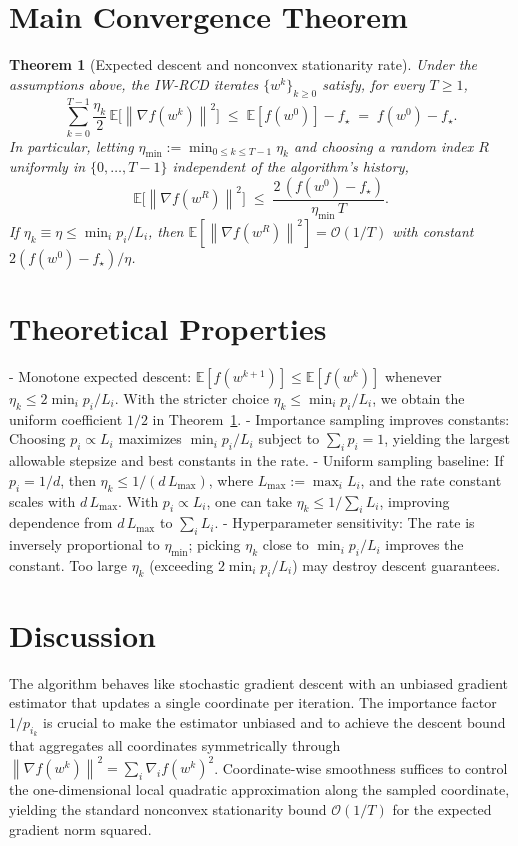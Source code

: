 \documentclass[11pt]{article}
\newtheorem{theorem}{Theorem}
\newcommand{\E}{\mathbb{E}}
\newcommand{\1}{\mathbbm{1}}
\newcommand{\norm}[1]{\left\lVert #1 \right\rVert}
\begin{document}
\section*{Main Convergence Theorem}
\begin{theorem}[Expected descent and nonconvex stationarity rate]
\label{thm:main}
Under the assumptions above, the IW-RCD iterates $\{w^k\}_{k\ge 0}$ satisfy, for every $T\ge 1$,
\[
\sum_{k=0}^{T-1} \frac{\eta_k}{2}\, \E\big[\norm{\nabla f(w^k)}^2\big]
\;\le\; \E[f(w^0)] - f_\star \;=\; f(w^0)-f_\star.
\]
In particular, letting $\eta_{\min}:=\min_{0\le k\le T-1}\eta_k$ and choosing a random index $R$ uniformly in $\{0,\dots,T-1\}$ independent of the algorithm's history,
\[
\E\big[\norm{\nabla f(w^R)}^2\big] \;\le\; \frac{2\,(f(w^0)-f_\star)}{\eta_{\min}\,T}.
\]
If $\eta_k\equiv \eta \le \min_i p_i/L_i$, then $\E[\norm{\nabla f(w^R)}^2]=\mathcal{O}(1/T)$ with constant $2(f(w^0)-f_\star)/\eta$.
\end{theorem}

\section*{Theoretical Properties}
- Monotone expected descent: $\E[f(w^{k+1})]\le \E[f(w^k)]$ whenever $\eta_k \le 2\min_i p_i/L_i$. With the stricter choice $\eta_k \le \min_i p_i/L_i$, we obtain the uniform coefficient $1/2$ in Theorem~\ref{thm:main}.
- Importance sampling improves constants: Choosing $p_i \propto L_i$ maximizes $\min_i p_i/L_i$ subject to $\sum_i p_i=1$, yielding the largest allowable stepsize and best constants in the rate.
- Uniform sampling baseline: If $p_i=1/d$, then $\eta_k \le 1/(d\,L_{\max})$, where $L_{\max}:=\max_i L_i$, and the rate constant scales with $d\,L_{\max}$. With $p_i \propto L_i$, one can take $\eta_k \le 1/\sum_i L_i$, improving dependence from $d\,L_{\max}$ to $\sum_i L_i$.
- Hyperparameter sensitivity: The rate is inversely proportional to $\eta_{\min}$; picking $\eta_k$ close to $\min_i p_i/L_i$ improves the constant. Too large $\eta_k$ (exceeding $2\min_i p_i/L_i$) may destroy descent guarantees.

\section*{Discussion}
The algorithm behaves like stochastic gradient descent with an unbiased gradient estimator that updates a single coordinate per iteration. The importance factor $1/p_{i_k}$ is crucial to make the estimator unbiased and to achieve the descent bound that aggregates all coordinates symmetrically through $\norm{\nabla f(w^k)}^2=\sum_i \nabla_i f(w^k)^2$. Coordinate-wise smoothness suffices to control the one-dimensional local quadratic approximation along the sampled coordinate, yielding the standard nonconvex stationarity bound $\mathcal{O}(1/T)$ for the expected gradient norm squared.
\end{document}
